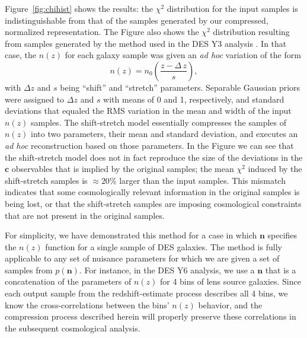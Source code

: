 \documentclass[linenumbers, onecolumn]{aastex7}
\newcommand{\vecc}{\ensuremath{\mathbf{c}}}
\newcommand{\vecn}{\ensuremath{\mathbf{n}}}
\begin{document}
Figure~\ref{fig:chihist} shows the results: the $\chi^2$ distribution
for the input samples is indistinguishable from that of the samples
generated by our compressed, normalized representation.
The Figure also shows the $\chi^2$ distribution resulting from samples
generated by the method used in the DES Y3 analysis \citep{y3pz}.  In
that case, the $n(z)$ for each galaxy sample was given an \textit{ad
  hoc} variation of the form
\begin{equation}
  n(z) = n_0\left(\frac{z-\Delta\,z}{s}\right),
  \label{eq:zs}
\end{equation}
with $\Delta z$ and $s$ being ``shift'' and ``stretch'' parameters.
Separable Gaussian priors were assigned to $\Delta z$ and $s$ with
means of 0 and 1, respectively, and standard deviations that equaled
the RMS variation in the mean and width of the input $n(z)$ samples.
The shift-stretch model essentially compresses the samples of $n(z)$
into two parameters, their mean and standard deviation, and executes
an \textit{ad hoc} reconstruction based on those parameters.
In the Figure we can see that the shift-stretch model does not in fact
reproduce the size of the deviations in the $\vecc$ observables that
is implied by the original samples; the mean $\chi^2$ induced by the
shift-stretch samples is $\approx20\%$ larger than the input samples.  
This mismatch indicates that some cosmologically relevant information in the
original samples is being lost, or that the shift-stretch samples are
imposing cosmological constraints that are not present in the original
samples.

For simplicity, we have demonstrated this method for a case in which
$\vecn$ specifies the $n(z)$ function for a single sample of DES
galaxies.  The method is fully applicable to any set of nuisance
parameters for which we are given a set of samples from $p(\vecn).$
For instance, in the DES Y6 analysis, we use a $\vecn$ that is a
concatenation of the parameters of $n(z)$ for 4 bins of lens source
galaxies.  Since each output sample from the  redshift-estimate
process describes all 4 bins, we know the cross-correlations between
the bins' $n(z)$ behavior, and the compression process described
herein will properly preserve these correlations in the subsequent
cosmological analysis.
\end{document}

